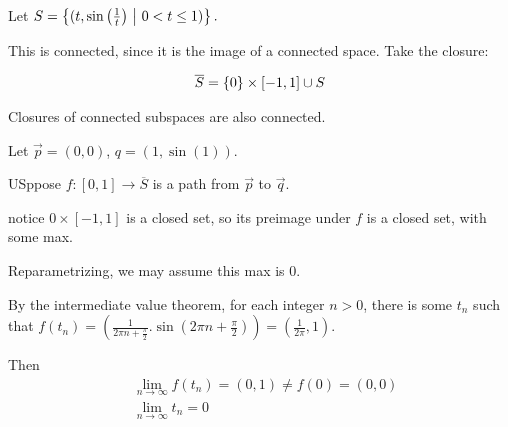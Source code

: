 \documentclass[12pt, twosided]{article}
\begin{document}
\begin{exa}

  Let \(S = \left\{ (t, \sin\left(\frac{1}{t}\right) \ \middle\vert\  0 < t \leq 1) \right\}.\)

  This is connected, since it is the image of a connected space. Take the closure:

  \begin{align*}
    \overline{S} = \left\{ 0 \right\} \times [-1, 1] \cup S
  \end{align*}
\end{exa}

\begin{fact}
  Closures of connected subspaces are also connected.
\end{fact}

Let \(\vec{p} = (0, 0)\), \(q = (1, \sin(1))\).

USppose \(f: [0,1] \to \overline{S}\) is a path from \(\vec{p}\) to \(\vec{q}\).

notice \(0 \times [-1, 1]\) is a closed set, so its preimage under \(f\) is a closed set, with some max.

Reparametrizing, we may assume this max is \(0\).

By the intermediate value theorem, for each integer \(n > 0\), there is some \(t_n\) such that \(f(t_n) = \left(\frac{1}{2\pi n + \frac{\pi}{2}}. \sin\left(2\pi n + \frac{\pi}{2}\right)\right) = \left(\frac{1}{2\pi}, 1\right) \).

Then
\begin{align*}
  &\lim_{n \to \infty} f(t_n) = (0, 1) \neq f(0) = (0, 0) \\
  &\lim_{n \to \infty} t_n = 0
\end{align*}
\end{document}

